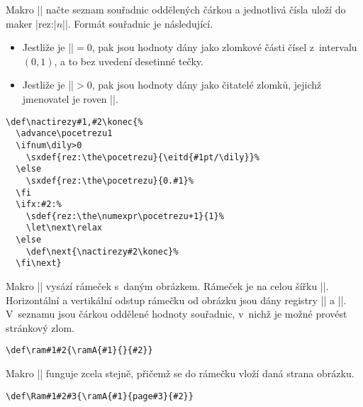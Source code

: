 \documentclass{csbulletin}
\begin{document}
Makro |\nactirezy| načte seznam souřadnic oddělených čárkou a jednotlivá čísla uloží do maker |\csname rez:|$n$|\endcsname|. Formát souřadnic je následující.
\begin{itemize}
\item Jestliže je |\dily|${}=0$, pak jsou hodnoty dány jako zlomkové části čísel z~intervalu~$(0,1)$, a to bez uvedení desetinné tečky.
\item Jestliže je |\dily|${}>0$, pak jsou hodnoty dány jako čitatelé zlomků, jejichž jmenovatel je roven |\dily|.
\end{itemize}


\begin{Verbatim}
\def\nactirezy#1,#2\konec{%
  \advance\pocetrezu1
  \ifnum\dily>0
    \sxdef{rez:\the\pocetrezu}{\eitd{#1pt/\dily}}%
  \else
    \sxdef{rez:\the\pocetrezu}{0.#1}%
  \fi
  \ifx:#2:%
    \sdef{rez:\the\numexpr\pocetrezu+1}{1}%
    \let\next\relax
  \else
    \def\next{\nactirezy#2\konec}%
  \fi\next}
\end{Verbatim}

Makro || vysází rámeček s~daným obrázkem. Rámeček je na celou šířku |\hsize|. Horizontální a vertikální odstup rámečku od obrázku jsou dány registry |\hodstup| a |\vodstup|. V~seznamu jsou čárkou oddělené hodnoty souřadnic, v~nichž je možné provést stránkový zlom.
\begin{Verbatim}
\def\ram#1#2{\ramA{#1}{}{#2}}
\end{Verbatim}
Makro || funguje zcela stejně, přičemž se do rámečku vloží daná strana obrázku.
\begin{Verbatim}
\def\Ram#1#2#3{\ramA{#1}{page#3}{#2}}
\end{Verbatim}
\end{document}
